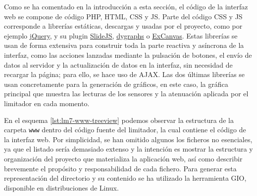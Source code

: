 Como se ha comentado en la introducción a esta sección, el código de la interfaz web se compone de código PHP, \acrshort{HTML}, \acrshort{CSS} y JS. Parte del código \acrshort{CSS} y JS corresponde a librerías estáticas, descargas y usadas por el proyecto, como por ejemplo \href{https://jquery.com/}{jQuery}, y su plugin \href{https://nathansearles.github.io/slidesjs/}{SlideJS}, \href{https://dygraphs.com/}{dygraphs} o \href{https://github.com/arv/explorercanvas}{ExCanvas}. Estas librerías se usan de forma extensiva para construir toda la parte reactiva y asíncrona de la interfaz, como las acciones lanzadas mediante la pulsación de botones, el envío de datos al servidor y la actualización de datos en la interfaz, sin necesidad de recargar la página; para ello, se hace uso de AJAX. Las dos últimas librerías se usan concretamente para la generación de gráficos, en este caso, la gráfica principal que muestra las lecturas de los sensores y la atenuación aplicada por el limitador en cada momento.

En el esquema \ref{lst:lm7-www-treeview} podemos observar la estructura de la carpeta \verb|www| dentro del código fuente del limitador, la cual contiene el código de la interfaz web. Por simplicidad, se han omitido algunos los ficheros no esenciales, ya que el listado sería demasiado extenso y la intención es mostrar la estructura y organización del proyecto que materializa la aplicación web, así como describir brevemente el propósito y responsabilidad de cada fichero. Para generar esta representación del directorio y su contenido se ha utilizado la herramienta \acrshort{GIO}, disponible en distribuciones de Linux.\newline

